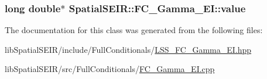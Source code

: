\hypertarget{classSpatialSEIR_1_1FC__Gamma__EI_a925437301fd547a6cc95dbe62d061e34}{
\subsubsection[{value}]{\setlength{\rightskip}{0pt plus 5cm}long double$\ast$ Spatial\-S\-E\-I\-R\-::\-F\-C\-\_\-\-Gamma\-\_\-\-E\-I\-::value}}\label{classSpatialSEIR_1_1FC__Gamma__EI_a925437301fd547a6cc95dbe62d061e34}


The documentation for this class was generated from the following files\-:\begin{DoxyCompactItemize}
\item 
lib\-Spatial\-S\-E\-I\-R/include/\-Full\-Conditionals/\hyperlink{LSS__FC__Gamma__EI_8hpp}{L\-S\-S\-\_\-\-F\-C\-\_\-\-Gamma\-\_\-\-E\-I.\-hpp}\item 
lib\-Spatial\-S\-E\-I\-R/src/\-Full\-Conditionals/\hyperlink{FC__Gamma__EI_8cpp}{F\-C\-\_\-\-Gamma\-\_\-\-E\-I.\-cpp}\end{DoxyCompactItemize}
